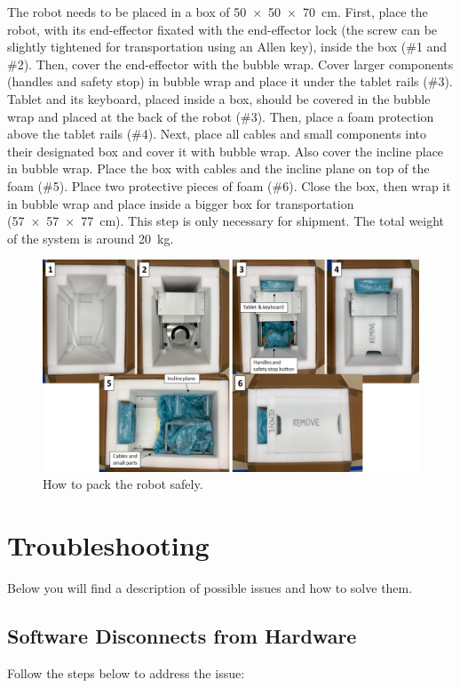 \documentclass[10pt,oneside,a4paper]{article}
\begin{document}
The robot needs to be placed in a box of \SI{50x50x70}{\cm}. First, place the robot, with its end-effector fixated with the end-effector lock (the screw can be slightly tightened for transportation using an Allen key), inside the box (\#1 and \#2). Then, cover the end-effector with the bubble wrap. Cover larger components (handles and safety stop) in bubble wrap and place it under the tablet rails (\#3). Tablet and its keyboard, placed inside a box, should be covered in the bubble wrap and placed at the back of the robot (\#3). Then, place a foam protection above the tablet rails (\#4). Next, place all cables and small components into their designated box and cover it with bubble wrap. Also cover the incline place in bubble wrap. Place the box with cables and the incline plane on top of the foam (\#5). Place two protective pieces of foam (\#6). Close the box, then wrap it in bubble wrap and place inside a bigger box for transportation (\SI{57x57x77}{\cm}). This step is only necessary for shipment. The total weight of the system is around \SI{20}{\kg}. 

\begin{figure}[h!]
\begin{center}
\includegraphics[width=\columnwidth]{images/Box/Packaging.png}
\caption{How to pack the robot safely.}
\label{fig:Packaging}
\end{center}
\end{figure}
\newpage
\section{Troubleshooting}
Below you will find a description of possible issues and how to solve them. 

\subsection{Software Disconnects from Hardware}
Follow the steps below to address the issue: 
\end{document}
